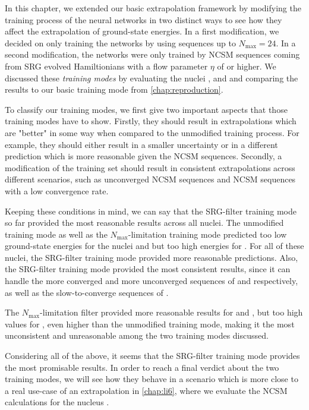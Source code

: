 In this chapter, we extended our basic extrapolation framework by modifying the training process of the neural networks in two distinct ways to see how they affect the extrapolation of ground-state energies. In a first modification, we decided on only training the networks by using sequences up to $N_\mathrm{max} = 24$. In a second modification, the networks were only trained by NCSM sequences coming from SRG evolved Hamiltionians with a flow parameter $\eta$ of  or higher. We discussed these \textit{training modes} by evaluating the nuclei ,  and  and comparing the results to our basic training mode from \autoref{chap:reproduction}.

To classify our training modes, we first give two important aspects that those training modes have to show. Firstly, they should result in extrapolations which are "better" in some way when compared to the unmodified training process. For example, they should either result in a smaller uncertainty or in a different prediction which is more reasonable given the NCSM sequences. Secondly, a modification of the training set should result in consistent extrapolations across different scenarios, such as unconverged NCSM sequences and NCSM sequences with a low convergence rate.

Keeping these conditions in mind, we can say that the SRG-filter training mode so far provided the most reasonable results across all nuclei. The unmodified training mode as well as the $N_\mathrm{max}$-limitation training mode predicted too low ground-state energies for the nuclei  and  but too high energies for . For all of these nuclei, the SRG-filter training mode provided more reasonable predictions. Also, the SRG-filter training mode provided the most consistent results, since it can handle the more converged and more unconverged sequences of  and  respectively, as well as the slow-to-converge sequences of .

The $N_\mathrm{max}$-limitation filter provided more reasonable results for  and , but too high values for , even higher than the unmodified training mode, making it the most unconsistent and unreasonable among the two training modes discussed.

Considering all of the above, it seems that the SRG-filter training mode provides the most promisable results. In order to reach a final verdict about the two training modes, we will see how they behave in a scenario which is more close to a real use-case of an extrapolation in \autoref{chap:li6}, where we evaluate the NCSM calculations for the nucleus .
